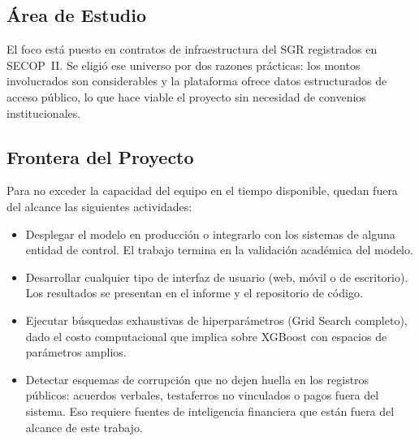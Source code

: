 \subsection{Área de Estudio}

El foco está puesto en contratos de infraestructura del SGR registrados en SECOP~II.
Se eligió ese universo por dos razones prácticas: los montos involucrados son
considerables y la plataforma ofrece datos estructurados de acceso público, lo que
hace viable el proyecto sin necesidad de convenios institucionales.

\subsection{Frontera del Proyecto}

Para no exceder la capacidad del equipo en el tiempo disponible, quedan fuera del
alcance las siguientes actividades:

\begin{itemize}
    \item Desplegar el modelo en producción o integrarlo con los sistemas de alguna
    entidad de control. El trabajo termina en la validación académica del modelo.

    \item Desarrollar cualquier tipo de interfaz de usuario (web, móvil o de
    escritorio). Los resultados se presentan en el informe y el repositorio de
    código.

    \item Ejecutar búsquedas exhaustivas de hiperparámetros (Grid Search completo),
    dado el costo computacional que implica sobre XGBoost con espacios de parámetros
    amplios.

    \item Detectar esquemas de corrupción que no dejen huella en los registros
    públicos: acuerdos verbales, testaferros no vinculados o pagos fuera del sistema.
    Eso requiere fuentes de inteligencia financiera que están fuera del alcance de
    este trabajo.
\end{itemize}

